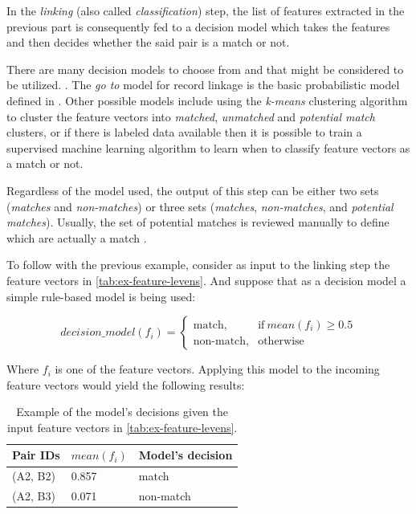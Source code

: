 \documentclass[epsfig,a4paper,11pt,titlepage,twoside,openany]{book}
\begin{document}
In the \textit{linking} (also called \textit{classification}) step, the list of features extracted in the previous part is consequently fed to a decision model which takes the features and then decides whether the said pair is a match or not.

There are many decision models to choose from and that might be considered to be utilized. \cite{gu06_decis_model_recor_linkag}.
The \textit{go to} model for record linkage is the basic probabilistic model defined in
\cite{fellegi69_theor_recor_linkag}. Other possible models \cite{Elfeky} include using the \textit{k-means} \cite{Hartigan1979} clustering algorithm to cluster the feature vectors into \textit{matched}, \textit{unmatched} and \textit{potential match} clusters, or if there is labeled data available then it is possible to train a supervised machine learning algorithm to learn when to classify
feature vectors as a match or not.

Regardless of the model used, the output of this step can be either two sets (\textit{matches} and \textit{non-matches}) or three sets (\textit{matches}, \textit{non-matches}, and \textit{potential matches}). Usually, the set of potential matches is reviewed manually to define which are actually a match \cite{dusetzina_m_2014}.

To follow with the previous example, consider as input to the linking step
the feature vectors in \autoref{tab:ex-feature-levens}. And suppose that as a
decision model a simple rule-based model is being used:

\begin{equation*}
  decision\_model(f_i) =
  \begin{cases}
    \text{match}, & \text{if}\ mean(f_i) \geq 0.5  \\
    \text{non-match}, & \text{otherwise}
  \end{cases}
\end{equation*}

Where $f_i$ is one of the feature vectors. Applying this model to the incoming
feature vectors would yield the following results:

\begin{table}[H]
  \centering
  \begin{tabular}{l|l|l}
    Pair IDs & $mean(f_i)$ & Model's decision \\ \hline
    (A2, B2) & 0.857       & match            \\
    (A2, B3) & 0.071       & non-match           
  \end{tabular}
  \caption{Example of the model's decisions given the input feature vectors in
    \autoref{tab:ex-feature-levens}.}
  \label{tab:ex-linking}
\end{table}
\end{document}
